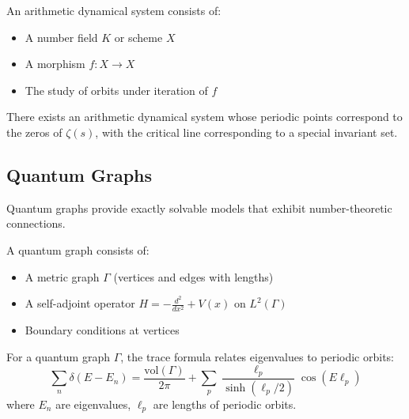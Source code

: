 \begin{definition}
\label{def:arithmetic_dynamical}
An arithmetic dynamical system consists of:
\begin{itemize}
\item A number field $K$ or scheme $X$
\item A morphism $f: X \to X$
\item The study of orbits under iteration of $f$
\end{itemize}
\end{definition}

\begin{conjecture}
\label{conj:dynamical_rh}
There exists an arithmetic dynamical system whose periodic points correspond to the zeros of $\zeta(s)$, with the critical line corresponding to a special invariant set.
\end{conjecture}

\subsection{Quantum Graphs}

Quantum graphs provide exactly solvable models that exhibit number-theoretic connections.

\begin{definition}
\label{def:quantum_graph}
A quantum graph consists of:
\begin{itemize}
\item A metric graph $\Gamma$ (vertices and edges with lengths)
\item A self-adjoint operator $H = -\frac{d^2}{dx^2} + V(x)$ on $L^2(\Gamma)$
\item Boundary conditions at vertices
\end{itemize}
\end{definition}

\begin{theorem}
\label{thm:quantum_graph_trace}
For a quantum graph $\Gamma$, the trace formula relates eigenvalues to periodic orbits:
\begin{equation}
\sum_n \delta(E - E_n) = \frac{\text{vol}(\Gamma)}{2\pi} + \sum_p \frac{\ell_p}{\sinh(\ell_p/2)} \cos(E\ell_p)
\label{eq:quantum_graph_trace}
\end{equation}
where $E_n$ are eigenvalues, $\ell_p$ are lengths of periodic orbits.
\end{theorem}

